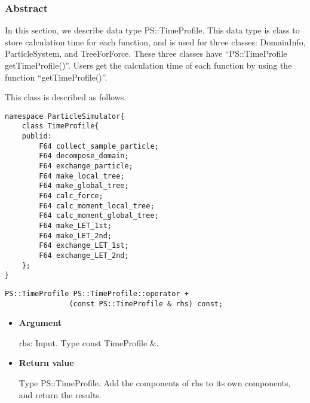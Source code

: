 \subsubsection{Abstract}

In this section, we describe data type PS::TimeProfile. This data type
is class to store calculation time for each function, and is used for
three classes: DomainInfo, ParticleSystem, and TreeForForce. These
three classes have ``PS::TimeProfile getTimeProfile()''. Users get the
calculation time of each function by using the function
``getTimeProfile()''.

This class is described as follows.

\begin{lstlisting}[caption=TimeProfile]
namespace ParticleSimulator{
    class TimeProfile{
    publid:
        F64 collect_sample_particle;
        F64 decompose_domain;
        F64 exchange_particle;
        F64 make_local_tree;
        F64 make_global_tree;
        F64 calc_force;
        F64 calc_moment_local_tree;
        F64 calc_moment_global_tree;
        F64 make_LET_1st;
        F64 make_LET_2nd;        
        F64 exchange_LET_1st;
        F64 exchange_LET_2nd;
    };
}    
\end{lstlisting}

\mbox{}

\begin{screen}
\begin{verbatim}
PS::TimeProfile PS::TimeProfile::operator + 
               (const PS::TimeProfile & rhs) const;
\end{verbatim}
\end{screen}

\begin{itemize}

\item{{\bf Argument}}

{rhs}: Input. Type const TimeProfile \&.

\item{{\bf Return value}}

Type PS::TimeProfile. Add the components of rhs to its own components,
and return the results.

\end{itemize}


